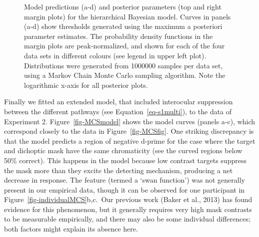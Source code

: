\documentclass[
  letterpaper,
  DIV=11,
  numbers=noendperiod]{scrartcl}
\begin{document}
\begin{figure}


\caption{\label{fig-bayesianmodel}Model predictions (a-d) and posterior
parameters (top and right margin plots) for the hierarchical Bayesian
model. Curves in panels (a-d) show thresholds generated using the
maximum a posteriori parameter estimates. The probability density
functions in the margin plots are peak-normalized, and shown for each of
the four data sets in different colours (see legend in upper left plot).
Distributions were generated from 1000000 samples per data set, using a
Markov Chain Monte Carlo sampling algorithm. Note the logarithmic x-axis
for all posterior plots.}

\end{figure}%

Finally we fitted an extended model, that included interocular
suppression between the different pathways (see
Equation~\ref{eq-s1multi}), to the data of Experiment 2.
Figure~\ref{fig-MCSmodel} shows the model curves (panels a-c), which
correspond closely to the data in Figure~\ref{fig-MCSfig}. One striking
discrepancy is that the model predicts a region of negative d-prime for
the case where the target and dichoptic mask have the same chromaticity
(see the curved regions below 50\% correct). This happens in the model
because low contrast targets suppress the mask more than they excite the
detecting mechanism, producing a net decrease in response. The feature
(termed a `swan function') was not generally present in our empirical
data, though it can be observed for one participant in
Figure~\ref{fig-individualMCS}b,c.~Our previous work (Baker et al.,
2013) has found evidence for this phenomenon, but it generally requires
very high mask contrasts to be measurable empirically, and there may
also be some individual differences; both factors might explain its
absence here.
\end{document}
